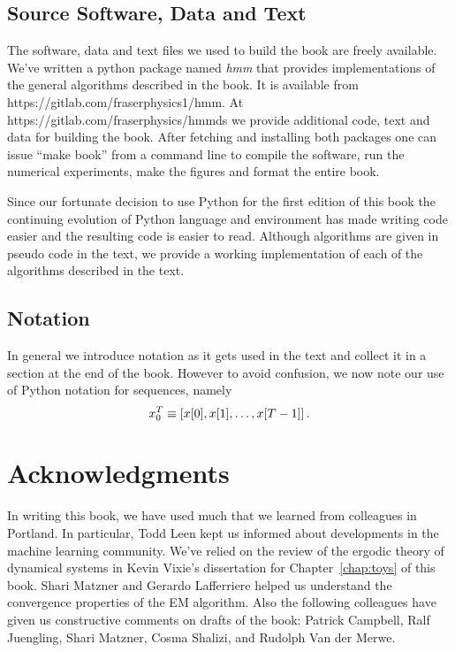 \documentclass[ltxbook,showlabels, commentsvisible]{hmmdsbook}
\begin{document}
\subsection*{Source Software, Data and Text}
\label{preface_software}

The software, data and text files we used to build the book are freely
available.  We've written a python package named \emph{hmm} that
provides implementations of the general algorithms described in the
book.  It is available from https://gitlab.com/fraserphysics1/hmm.  At
https://gitlab.com/fraserphysics/hmmds we provide additional code,
text and data for building the book.  After fetching and installing
both packages one can issue ``make book'' from a command line to
compile the software, run the numerical experiments, make the figures
and format the entire book.  

Since our fortunate decision to use Python for the first edition of
this book the continuing evolution of Python language and environment
has made writing code easier and the resulting code is easier to
read.  Although algorithms are given in pseudo code in the text, we
provide a working implementation of each of the algorithms described
in the text.

\subsection*{Notation}
\label{preface_notation}

In general we introduce notation as it gets used in the text and
collect it in a section at the end of the book.  However to avoid
confusion, we now note our use of Python notation for sequences,
namely
\begin{equation*}
  x_{0}^{T} \equiv \left[ x[0], x[1], \ldots, x[T-1] \right].
\end{equation*}

\section*{Acknowledgments}
%
\label{sec:ack}
\longpage%

In writing this book, we have used much that we learned from colleagues
in Portland.  In particular, Todd Leen kept us informed about
developments in the machine learning community.  We've relied on the
review of the ergodic theory of dynamical systems in Kevin Vixie's
dissertation\cite{vixie02} for Chapter~\ref{chap:toys} of this book.
Shari Matzner and Gerardo Lafferriere helped us understand the
convergence properties of the EM algorithm.  Also the following
colleagues have given us constructive comments on drafts of the book:
% 
Patrick Campbell, %
Ralf Juengling, %
Shari Matzner, %
Cosma Shalizi, %
and %
Rudolph Van der Merwe. %
\end{document}
